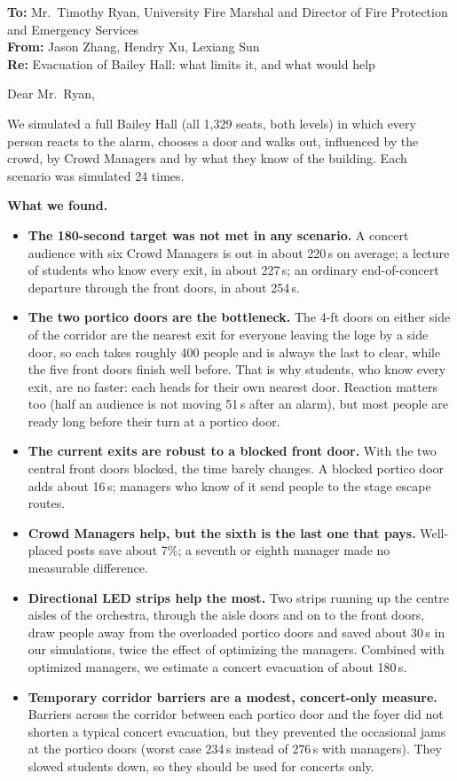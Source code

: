 \documentclass{article}
\begin{document}
{\small
\setlength{\parskip}{4pt}
\noindent\textbf{To:} Mr.\ Timothy Ryan, University Fire Marshal and Director of Fire Protection and Emergency Services\\
\textbf{From:} Jason Zhang, Hendry Xu, Lexiang Sun\\
\textbf{Re:} Evacuation of Bailey Hall: what limits it, and what would help

\medskip
\noindent Dear Mr.\ Ryan,

We simulated a full Bailey Hall (all 1,329 seats, both levels) in which every person reacts to the alarm, chooses a door and walks out, influenced by the crowd, by Crowd Managers and by what they know of the building. Each scenario was simulated 24 times.

\textbf{What we found.}\vspace{-4pt}
\begin{itemize}
    \item \textbf{The 180-second target was not met in any scenario.} A concert audience with six Crowd Managers is out in about 220\,s on average; a lecture of students who know every exit, in about 227\,s; an ordinary end-of-concert departure through the front doors, in about 254\,s.
    \item \textbf{The two portico doors are the bottleneck.} The 4-ft doors on either side of the corridor are the nearest exit for everyone leaving the loge by a side door, so each takes roughly 400 people and is always the last to clear, while the five front doors finish well before. That is why students, who know every exit, are no faster: each heads for their own nearest door. Reaction matters too (half an audience is not moving 51\,s after an alarm), but most people are ready long before their turn at a portico door.
    \item \textbf{The current exits are robust to a blocked front door.} With the two central front doors blocked, the time barely changes. A blocked portico door adds about 16\,s; managers who know of it send people to the stage escape routes.
    \item \textbf{Crowd Managers help, but the sixth is the last one that pays.} Well-placed posts save about 7\%; a seventh or eighth manager made no measurable difference.
    \item \textbf{Directional LED strips help the most.} Two strips running up the centre aisles of the orchestra, through the aisle doors and on to the front doors, draw people away from the overloaded portico doors and saved about 30\,s in our simulations, twice the effect of optimizing the managers. Combined with optimized managers, we estimate a concert evacuation of about 180\,s.
    \item \textbf{Temporary corridor barriers are a modest, concert-only measure.} Barriers across the corridor between each portico door and the foyer did not shorten a typical concert evacuation, but they prevented the occasional jams at the portico doors (worst case 234\,s instead of 276\,s with managers). They slowed students down, so they should be used for concerts only.
\end{itemize}

}
\end{document}
